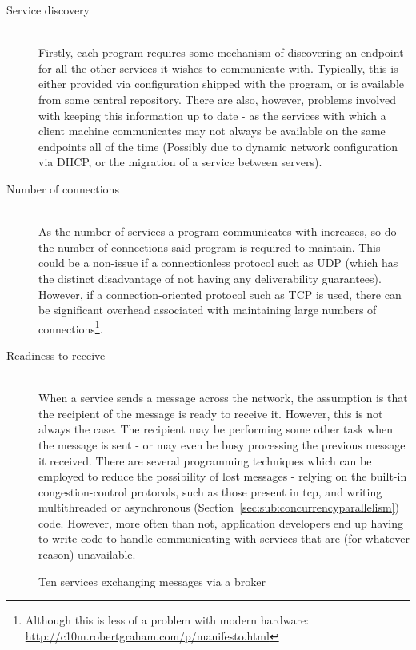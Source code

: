 \begin{description}
  \item[Service discovery] \hfill \\
  Firstly, each program requires some mechanism of discovering an endpoint for
  all the other services it wishes to communicate with. Typically, this is
  either provided via configuration shipped with the program, or is available
  from some central repository. There are also, however, problems involved with
  keeping this information up to date - as the services with which a client
  machine communicates may not always be available on the same endpoints all of
  the time (Possibly due to dynamic network configuration via DHCP, or the
  migration of a service between servers).
  \item[Number of connections] \hfill \\
  As the number of services a program communicates with increases, so do the
  number of connections said program is required to maintain. This could be a
  non-issue if a connectionless protocol such as UDP (which has the distinct
  disadvantage of not having any deliverability guarantees). However, if a
  connection-oriented protocol such as TCP is used, there can be significant
  overhead associated with maintaining large numbers of
  connections\footnote{Although this is less of a problem with modern hardware:
  \url{http://c10m.robertgraham.com/p/manifesto.html}}.
  \item[Readiness to receive] \hfill \\
  When a service sends a message across the network, the assumption is that the
  recipient of the message is ready to receive it.  However, this is not always
  the case. The recipient may be performing some other task when the message is
  sent - or may even be busy processing the previous message it received. There
  are several programming techniques which can be employed to reduce the
  possibility of lost messages - relying on  the built-in congestion-control
  protocols, such as those present in \gls{tcp}, and writing multithreaded or
  asynchronous (Section~\ref{sec:sub:concurrencyparallelism}) code. However,
  more often than not, application developers end up having to write code to
  handle communicating with services that are (for whatever reason) unavailable.
\end{description}

\begin{figure}[ht]
  \centering
  
  \caption{Ten services exchanging messages via a broker}
  \label{fig:tikz:messageBroker}
\end{figure}

